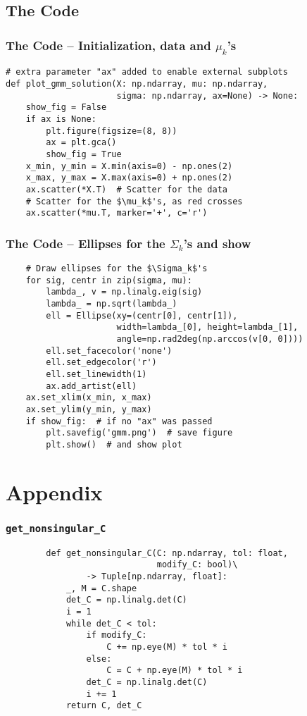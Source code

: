 \documentclass[11pt]{beamer}
\begin{document}
    \subsection{The Code}
    \begin{frame}[fragile=singleslide]
        \frametitle{The Code -- Initialization, data and $\mu_k$'s}
        \begin{verbatim}
# extra parameter "ax" added to enable external subplots
def plot_gmm_solution(X: np.ndarray, mu: np.ndarray,
                      sigma: np.ndarray, ax=None) -> None:
    show_fig = False
    if ax is None:
        plt.figure(figsize=(8, 8))
        ax = plt.gca()
        show_fig = True
    x_min, y_min = X.min(axis=0) - np.ones(2)
    x_max, y_max = X.max(axis=0) + np.ones(2)
    ax.scatter(*X.T)  # Scatter for the data
    # Scatter for the $\mu_k$'s, as red crosses
    ax.scatter(*mu.T, marker='+', c='r')
        \end{verbatim}
    \end{frame}
    \begin{frame}[fragile=singleslide]
    \frametitle{The Code -- Ellipses for the $\Sigma_k$'s and show}
    \begin{verbatim}
    # Draw ellipses for the $\Sigma_k$'s
    for sig, centr in zip(sigma, mu):
        lambda_, v = np.linalg.eig(sig)
        lambda_ = np.sqrt(lambda_)
        ell = Ellipse(xy=(centr[0], centr[1]),
                      width=lambda_[0], height=lambda_[1],
                      angle=np.rad2deg(np.arccos(v[0, 0])))
        ell.set_facecolor('none')
        ell.set_edgecolor('r')
        ell.set_linewidth(1)
        ax.add_artist(ell)
    ax.set_xlim(x_min, x_max)
    ax.set_ylim(y_min, y_max)
    if show_fig:  # if no "ax" was passed
        plt.savefig('gmm.png')  # save figure
        plt.show()  # and show plot
        \end{verbatim}
    \end{frame}
	\section{Appendix}
    \begin{frame}[fragile=singleslide]
        \frametitle{\texttt{get\_nonsingular\_C}}
        \begin{verbatim}
        def get_nonsingular_C(C: np.ndarray, tol: float,
                              modify_C: bool)\
                -> Tuple[np.ndarray, float]:
            _, M = C.shape
            det_C = np.linalg.det(C)
            i = 1
            while det_C < tol:
                if modify_C:
                    C += np.eye(M) * tol * i
                else:
                    C = C + np.eye(M) * tol * i
                det_C = np.linalg.det(C)
                i += 1
            return C, det_C
        \end{verbatim}
    \end{frame}
\end{document}
